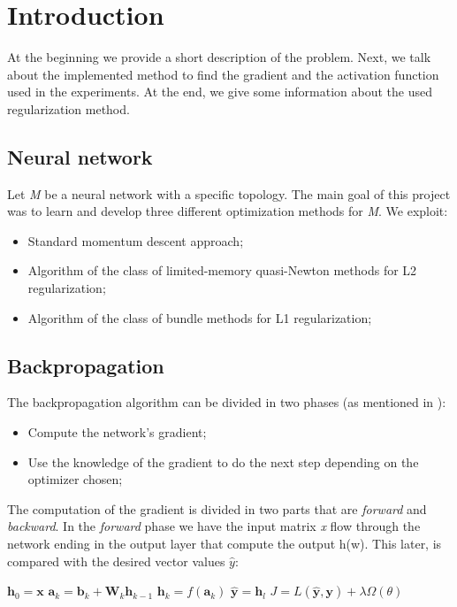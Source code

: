 \section{Introduction}
At the beginning we provide a short description of the problem. Next, we talk about the implemented method to find the gradient and the activation function used in the experiments. At the end, we give some information about the used regularization method.
\subsection{Neural network}
Let \textit{M} be a neural network with a specific topology. The main goal of this project was to learn and develop three different optimization methods for \textit{M}. We exploit:
\begin{itemize}
	\item Standard momentum descent approach;
	\item Algorithm of the class of limited-memory quasi-Newton methods for L2 regularization;
	\item Algorithm of the class of bundle methods for L1 regularization;
\end{itemize}
\subsection{Backpropagation}
The backpropagation algorithm can be divided in two phases (as mentioned in \cite{backpropagation}):
\begin{itemize}
	\item Compute the network's gradient;
	\item Use the knowledge of the gradient to do the next step depending on the optimizer chosen;
\end{itemize}
The computation of the gradient is divided in two parts that are \textit{forward} and \textit{backward}. In the \textit{forward} phase we have the input matrix \textit{x} flow through the network ending in the output layer that compute the output h(w). This later, is compared with the desired vector values $\widehat{y}$:
\begin{algorithm}[H]
	\label{alg:fp}
	\begin{algorithmic}[1]
		\State $\mathbf{h}_{0} = \mathbf{x}$
		\State $\mathbf{a}_{k} = \mathbf{b}_{k} + \mathbf{W}_{k}\mathbf{h}_{k - 1}$
		\State $\mathbf{h}_{k} = f(\mathbf{a}_{k})$
		\EndFor
		\State $\hat{\mathbf{y}} = \mathbf{h}_{l}$
		\State $J = L(\hat{\mathbf{y}}, \mathbf{y}) + \lambda \Omega(\theta)$
		\EndProcedure
	\end{algorithmic}
\end{algorithm}
